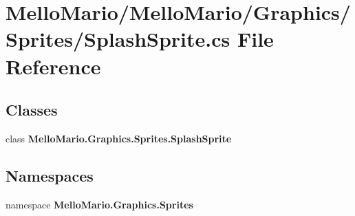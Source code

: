 \section{Mello\+Mario/\+Mello\+Mario/\+Graphics/\+Sprites/\+Splash\+Sprite.cs File Reference}
\label{SplashSprite_8cs}
\subsection*{Classes}
\begin{DoxyCompactItemize}
\item 
class \textbf{ Mello\+Mario.\+Graphics.\+Sprites.\+Splash\+Sprite}
\end{DoxyCompactItemize}
\subsection*{Namespaces}
\begin{DoxyCompactItemize}
\item 
namespace \textbf{ Mello\+Mario.\+Graphics.\+Sprites}
\end{DoxyCompactItemize}
